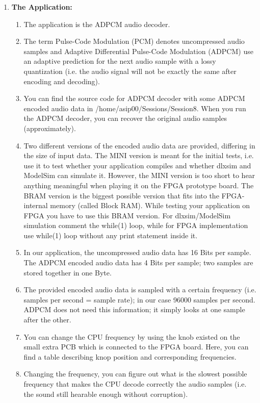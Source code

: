 \documentclass[
]{article}
\begin{document}
\begin{enumerate}
\def\labelenumi{\arabic{enumi}.}
\item
  \textbf{The Application:}

  \begin{enumerate}
  \def\labelenumii{\arabic{enumii}.}
  \item
    The application is the ADPCM audio decoder.
  \item
    The term Pulse-Code Modulation (PCM) denotes uncompressed audio
    samples and Adaptive Differential Pulse-Code Modulation (ADPCM) use
    an adaptive prediction for the next audio sample with a lossy
    quantization (i.e. the audio signal will not be exactly the same
    after encoding and decoding).
  \item
    You can find the source code for ADPCM decoder with some ADPCM
    encoded audio data in /home/asip00/Sessions/Session8. When you run
    the ADPCM decoder, you can recover the original audio samples
    (approximately).
  \item
    Two different versions of the encoded audio data are provided,
    differing in the size of input data. The MINI version is meant for
    the initial tests, i.e. use it to test whether your application
    compiles and whether dlxsim and ModelSim can simulate it. However,
    the MINI version is too short to hear anything meaningful when
    playing it on the FPGA prototype board. The BRAM version is the
    biggest possible version that fits into the FPGA-internal memory
    (called Block RAM). While testing your application on FPGA you have
    to use this BRAM version. For dlxsim/ModelSim simulation comment the
    while(1) loop, while for FPGA implementation use while(1) loop
    without any print statement inside it.
  \item
    In our application, the uncompressed audio data has 16 Bits per
    sample. The ADPCM encoded audio data has 4 Bits per sample; two
    samples are stored together in one Byte.
  \item
    The provided encoded audio data is sampled with a certain frequency
    (i.e. samples per second = sample rate); in our case 96000 samples
    per second. ADPCM does not need this information; it simply looks at
    one sample after the other.
  \item
    You can change the CPU frequency by using the knob existed on the
    small extra PCB which is connected to the FPGA board. Here, you can
    find a table describing knop position and corresponding frequencies.
  \item
    Changing the frequency, you can figure out what is the slowest
    possible frequency that makes the CPU decode correctly the audio
    samples (i.e. the sound still hearable enough without corruption).
  \end{enumerate}
\end{enumerate}
\end{document}
